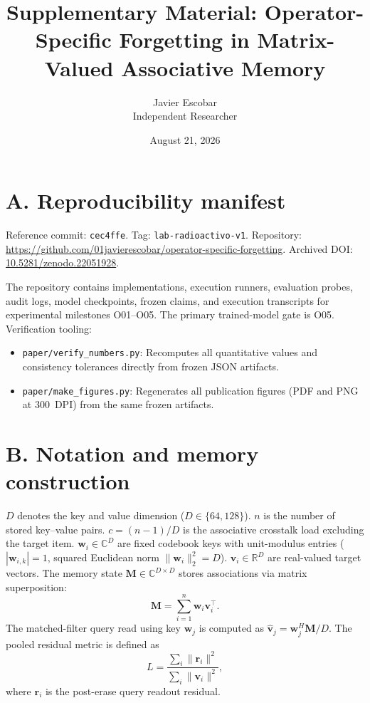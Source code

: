 \documentclass[11pt,a4paper]{article}
\title{\textbf{Supplementary Material: Operator-Specific Forgetting in Matrix-Valued Associative Memory}}
\author{Javier Escobar\\
  Independent Researcher}
\date{August 21, 2026}
\newcommand{\M}{\mathbf{M}}
\newcommand{\R}{\mathbb{R}}
\newcommand{\C}{\mathbb{C}}
\begin{document}
\maketitle

\section{A. Reproducibility manifest}\label{sec:A}

Reference commit: \texttt{cec4ffe}. Tag: \texttt{lab-radioactivo-v1}. Repository: \url{https://github.com/01javierescobar/operator-specific-forgetting}. Archived DOI: \href{https://doi.org/10.5281/zenodo.22051928}{10.5281/zenodo.22051928}.

The repository contains implementations, execution runners, evaluation probes, audit logs, model checkpoints, frozen claims, and execution transcripts for experimental milestones O01--O05. The primary trained-model gate is O05. Verification tooling:
\begin{itemize}
  \item \texttt{paper/verify\_numbers.py}: Recomputes all quantitative values and consistency tolerances directly from frozen JSON artifacts.
  \item \texttt{paper/make\_figures.py}: Regenerates all publication figures (PDF and PNG at 300~DPI) from the same frozen artifacts.
\end{itemize}

\section{B. Notation and memory construction}\label{sec:B}

$D$ denotes the key and value dimension ($D \in \{64, 128\}$). $n$ is the number of stored key--value pairs. $c=(n-1)/D$ is the associative crosstalk load excluding the target item. $\mathbf{w}_i \in \C^D$ are fixed codebook keys with unit-modulus entries ($|\mathbf{w}_{i,k}|=1$, squared Euclidean norm $\|\mathbf{w}_i\|_2^2 = D$). $\mathbf{v}_i \in \R^D$ are real-valued target vectors. The memory state $\M \in \C^{D \times D}$ stores associations via matrix superposition:
\begin{equation}
\M = \sum_{i=1}^n \mathbf{w}_i \mathbf{v}_i^\top .
\end{equation}
The matched-filter query read using key $\mathbf{w}_j$ is computed as $\hat{\mathbf{v}}_j = \mathbf{w}_j^H \M / D$. The pooled residual metric is defined as
\begin{equation}
L = \frac{\sum_i \|\mathbf{r}_i\|^2}{\sum_i \|\mathbf{v}_i\|^2},
\end{equation}
where $\mathbf{r}_i$ is the post-erase query readout residual.
\end{document}
